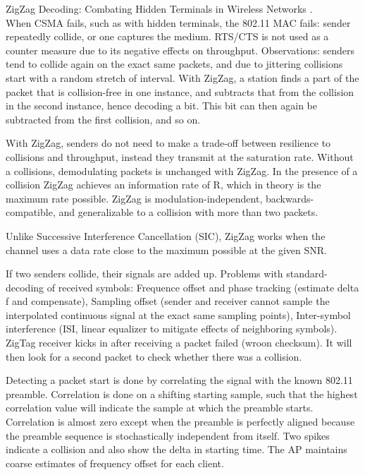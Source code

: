 ZigZag Decoding: Combating Hidden Terminals in Wireless Networks \cite{gollakota2008}.\\

When CSMA fails, such as with hidden terminals, the 802.11 MAC fails: sender repeatedly collide, or one captures the medium. RTS/CTS is not used as a counter measure due to its negative effects on throughput. Observations: senders tend to collide again on the exact same packets, and due to jittering collisions start with a random stretch of interval. With ZigZag, a station finds a part of the packet that is collision-free in one instance, and subtracts that from the collision in the second instance, hence decoding a bit. This bit can then again be subtracted from the first collision, and so on.

With ZigZag, senders do not need to make a trade-off between resilience to collisions and throughput, instead they transmit at the saturation rate. Without a collisions, demodulating packets is unchanged with ZigZag. In the presence of a collision ZigZag achieves an information rate of R, which in theory is the maximum rate possible. ZigZag is modulation-independent, backwards-compatible, and generalizable to a collision with more than two packets.

Unlike Successive Interference Cancellation (SIC), ZigZag works when the channel uses a data rate close to the maximum possible at the given SNR.

If two senders collide, their signals are added up. Problems with standard-decoding of received symbols: Frequence offset and phase tracking (estimate delta f and compensate), Sampling offset (sender and receiver cannot sample the interpolated continuous signal at the exact same sampling points), Inter-symbol interference (ISI, linear equalizer to mitigate effects of neighboring symbols). ZigTag receiver kicks in after receiving a packet failed (wroon checksum).  It will then look for a second packet to check whether there was a collision.

Detecting a packet start is done by correlating the signal with the known 802.11 preamble. Correlation is done on a shifting starting sample, such that the highest correlation value will indicate the sample at which the preamble starts. Correlation is almost zero except when the preamble is perfectly aligned because the preamble sequence is stochastically independent from itself. Two spikes indicate a collision and also show the delta in starting time. The AP maintains coarse estimates of frequency offset for each client.

